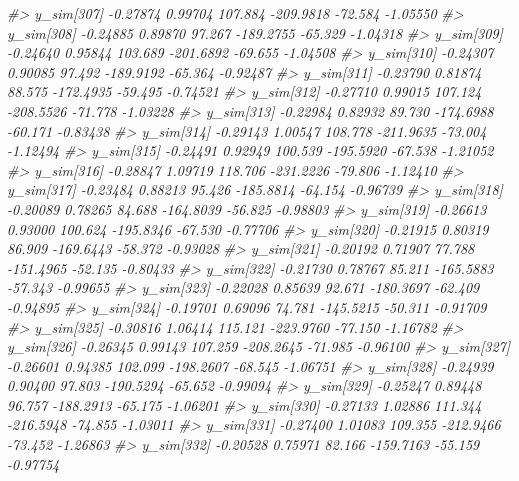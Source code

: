 \documentclass[
  10pt,
  italian,
  a4paper,
  extrafontsizes,onecolumn,openright
  ]{memoir}
\newenvironment{Shaded}{\begin{snugshade}}{\end{snugshade}}
\newcommand{\CommentTok}[1]{\textcolor[rgb]{0.56,0.35,0.01}{\textit{#1}}}
\begin{document}
\begin{Shaded}
\begin{Highlighting}[]
\CommentTok{\#\textgreater{} y\_sim[307] {-}0.27874 0.99704 107.884 {-}209.9818 {-}72.584 {-}1.05550}
\CommentTok{\#\textgreater{} y\_sim[308] {-}0.24885 0.89870  97.267 {-}189.2755 {-}65.329 {-}1.04318}
\CommentTok{\#\textgreater{} y\_sim[309] {-}0.24640 0.95844 103.689 {-}201.6892 {-}69.655 {-}1.04508}
\CommentTok{\#\textgreater{} y\_sim[310] {-}0.24307 0.90085  97.492 {-}189.9192 {-}65.364 {-}0.92487}
\CommentTok{\#\textgreater{} y\_sim[311] {-}0.23790 0.81874  88.575 {-}172.4935 {-}59.495 {-}0.74521}
\CommentTok{\#\textgreater{} y\_sim[312] {-}0.27710 0.99015 107.124 {-}208.5526 {-}71.778 {-}1.03228}
\CommentTok{\#\textgreater{} y\_sim[313] {-}0.22984 0.82932  89.730 {-}174.6988 {-}60.171 {-}0.83438}
\CommentTok{\#\textgreater{} y\_sim[314] {-}0.29143 1.00547 108.778 {-}211.9635 {-}73.004 {-}1.12494}
\CommentTok{\#\textgreater{} y\_sim[315] {-}0.24491 0.92949 100.539 {-}195.5920 {-}67.538 {-}1.21052}
\CommentTok{\#\textgreater{} y\_sim[316] {-}0.28847 1.09719 118.706 {-}231.2226 {-}79.806 {-}1.12410}
\CommentTok{\#\textgreater{} y\_sim[317] {-}0.23484 0.88213  95.426 {-}185.8814 {-}64.154 {-}0.96739}
\CommentTok{\#\textgreater{} y\_sim[318] {-}0.20089 0.78265  84.688 {-}164.8039 {-}56.825 {-}0.98803}
\CommentTok{\#\textgreater{} y\_sim[319] {-}0.26613 0.93000 100.624 {-}195.8346 {-}67.530 {-}0.77706}
\CommentTok{\#\textgreater{} y\_sim[320] {-}0.21915 0.80319  86.909 {-}169.6443 {-}58.372 {-}0.93028}
\CommentTok{\#\textgreater{} y\_sim[321] {-}0.20192 0.71907  77.788 {-}151.4965 {-}52.135 {-}0.80433}
\CommentTok{\#\textgreater{} y\_sim[322] {-}0.21730 0.78767  85.211 {-}165.5883 {-}57.343 {-}0.99655}
\CommentTok{\#\textgreater{} y\_sim[323] {-}0.22028 0.85639  92.671 {-}180.3697 {-}62.409 {-}0.94895}
\CommentTok{\#\textgreater{} y\_sim[324] {-}0.19701 0.69096  74.781 {-}145.5215 {-}50.311 {-}0.91709}
\CommentTok{\#\textgreater{} y\_sim[325] {-}0.30816 1.06414 115.121 {-}223.9760 {-}77.150 {-}1.16782}
\CommentTok{\#\textgreater{} y\_sim[326] {-}0.26345 0.99143 107.259 {-}208.2645 {-}71.985 {-}0.96100}
\CommentTok{\#\textgreater{} y\_sim[327] {-}0.26601 0.94385 102.099 {-}198.2607 {-}68.545 {-}1.06751}
\CommentTok{\#\textgreater{} y\_sim[328] {-}0.24939 0.90400  97.803 {-}190.5294 {-}65.652 {-}0.99094}
\CommentTok{\#\textgreater{} y\_sim[329] {-}0.25247 0.89448  96.757 {-}188.2913 {-}65.175 {-}1.06201}
\CommentTok{\#\textgreater{} y\_sim[330] {-}0.27133 1.02886 111.344 {-}216.5948 {-}74.855 {-}1.03011}
\CommentTok{\#\textgreater{} y\_sim[331] {-}0.27400 1.01083 109.355 {-}212.9466 {-}73.452 {-}1.26863}
\CommentTok{\#\textgreater{} y\_sim[332] {-}0.20528 0.75971  82.166 {-}159.7163 {-}55.159 {-}0.97754}

\end{Highlighting}
\end{Shaded}
\end{document}
